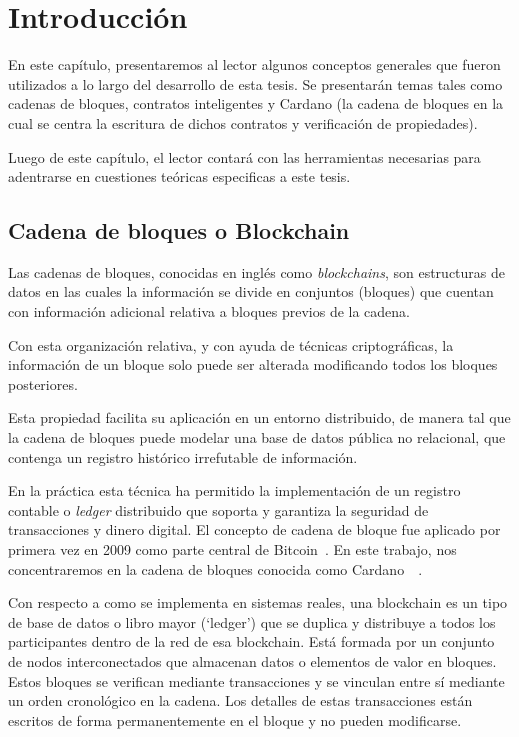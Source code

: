 \documentclass[12pt]{book}
\begin{document}
\chapter{Introducción}

En este capítulo, presentaremos al lector algunos conceptos generales que fueron utilizados a lo largo del desarrollo de esta tesis. Se presentarán temas tales como cadenas de bloques, contratos inteligentes y Cardano (la cadena de bloques en la cual se centra la escritura de dichos contratos y verificación de propiedades).

Luego de este capítulo, el lector contará con las herramientas necesarias para adentrarse en cuestiones teóricas especificas a este tesis.

\section{Cadena de bloques o Blockchain}
Las cadenas de bloques, conocidas en inglés como \textit{blockchains}, son estructuras de datos en las cuales la información se divide en conjuntos (bloques) que cuentan con información adicional relativa a bloques previos de la cadena.

Con esta organización relativa, y con ayuda de técnicas criptográficas, la información de un bloque solo puede ser alterada modificando todos los bloques posteriores.

Esta propiedad facilita su aplicación en un entorno distribuido, de manera tal que la cadena de bloques puede modelar una base de datos pública no relacional, que contenga un registro histórico irrefutable de información.

En la práctica esta técnica ha permitido la implementación de un registro contable o \textit{ledger} distribuido que soporta y garantiza la seguridad de transacciones y dinero digital.
El concepto de cadena de bloque fue aplicado por primera vez en 2009 como parte central de Bitcoin~\cite{nakamoto2008bitcoin}. En este trabajo, nos concentraremos en la cadena de bloques conocida como Cardano~\cite{cardano_website}~\cite{cardano_utxo_ledger}.

Con respecto a como se implementa en sistemas reales, una blockchain es un tipo de base de datos o libro mayor (`ledger') que se duplica y distribuye a todos los participantes dentro de la red de esa blockchain. Está formada por un conjunto de nodos interconectados que almacenan datos o elementos de valor en bloques. Estos bloques se verifican mediante transacciones y se vinculan entre sí mediante un orden cronológico en la cadena. Los detalles de estas transacciones están escritos de forma permanentemente en el bloque y no pueden modificarse.
\end{document}

